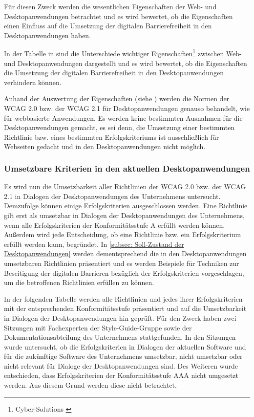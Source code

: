 Für diesen Zweck werden die wesentlichen Eigenschaften der Web- und Desktopanwendungen betrachtet und es wird bewertet, ob die Eigenschaften einen Einfluss auf die Umsetzung der digitalen Barrierefreiheit in den Desktopanwendungen haben.

In der Tabelle in  sind die Unterschiede wichtiger Eigenschaften\footnote{Cyber-Solutions \cite{CyberSolutions}} zwischen Web- und Desktopanwendungen dargestellt und es wird bewertet, ob die Eigenschaften die Umsetzung der digitalen Barrierefreiheit in den Desktopanwendungen verhindern können.

Anhand der Auswertung der Eigenschaften (siehe ) werden die Normen der \ac{WCAG} 2.0 bzw. der \ac{WCAG} 2.1 für Desktopanwendungen genauso behandelt, wie für webbasierte Anwendungen. Es werden keine bestimmten Ausnahmen für die Desktopanwendungen gemacht, es sei denn, die Umsetzung einer bestimmten Richtlinie bzw. eines bestimmten Erfolgskriteriums ist ausschließlich für Webseiten gedacht und in den Desktopanwendungen nicht möglich.

\subsubsection{Umsetzbare Kriterien in den aktuellen Desktopanwendungen}
\label{subsec: Umsetzbare Kriterien}

Es wird nun die Umsetzbarkeit aller Richtlinien der \ac{WCAG} 2.0 bzw. der \ac{WCAG} 2.1 in Dialogen der Desktopanwendungen des Unternehmens untersucht. Demzufolge können einige  Erfolgskriterien ausgeschlossen werden. Eine Richtlinie gilt erst als umsetzbar in Dialogen der Desktopanwendungen des Unternehmens, wenn alle Erfolgskriterien der Konformitätsstufe A erfüllt werden können. Außerdem wird jede Entscheidung, ob eine Richtlinie bzw. ein Erfolgskriterium erfüllt werden kann, begründet. In \cref{subsec: Soll-Zustand der Desktopanwendungen} werden dementsprechend die in den Desktopanwendungen umsetzbaren Richtlinien präsentiert und es werden Beispiele für Techniken zur Beseitigung der digitalen Barrieren bezüglich der Erfolgskriterien vorgeschlagen, um die betroffenen Richtlinien erfüllen zu können.

In der folgenden Tabelle werden alle Richtlinien und jedes ihrer Erfolgskriterien mit der entsprechenden Konformitätsstufe präsentiert und auf die Umsetzbarkeit in Dialogen der Desktopanwendungen hin geprüft. Für den Zweck haben zwei Sitzungen mit Fachexperten der Style-Guide-Gruppe sowie der Dokumentationsabteilung des Unternehmens stattgefunden. In den Sitzungen wurde untersucht, ob die Erfolgskriterien in Dialogen der aktuellen Software und für die zukünftige Software des Unternehmens umsetzbar, nicht umsetzbar oder nicht relevant für Dialoge der Desktopanwendungen sind. Des Weiteren wurde entschieden, dass Erfolgskriterien der Konformitätsstufe AAA nicht umgesetzt werden. Aus diesem Grund werden diese nicht betrachtet.

